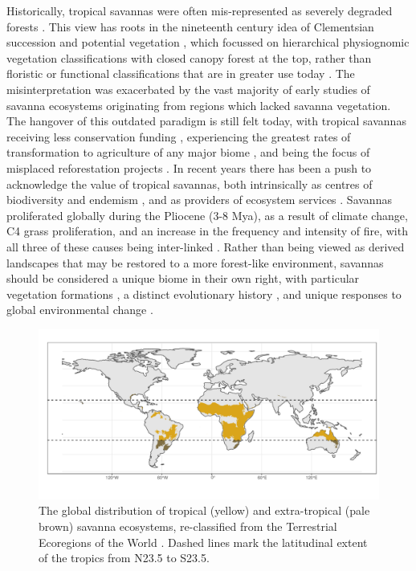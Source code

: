 \begin{refsection}
Historically, tropical savannas were often mis-represented as severely degraded forests \citep{Veldman2016}. This view has roots in the nineteenth century idea of Clementsian succession and potential vegetation \citep{Pulsford2014}, which focussed on hierarchical physiognomic vegetation classifications with closed canopy forest at the top, rather than floristic or functional classifications that are in greater use today \citep{Aleman2020}. The misinterpretation was exacerbated by the vast majority of early studies of savanna ecosystems originating from regions which lacked savanna vegetation. The hangover of this outdated paradigm is still felt today, with tropical savannas receiving less conservation funding \citep{Watson2016}, experiencing the greatest rates of transformation to agriculture of any major biome \citep{Hoekstra2004, Parr2014}, and being the focus of misplaced reforestation projects \citep{Silveira2020, Kumar2020, Laestadius2011}. In recent years there has been a push to acknowledge the value of tropical savannas, both intrinsically as centres of biodiversity and endemism \citep{Kumar2020, Pennington2018}, and as providers of ecosystem services \citep{Ryan2016}. Savannas proliferated globally during the Pliocene (\textapprox{}3-8 Mya), as a result of climate change, C4 grass proliferation, and an increase in the frequency and intensity of fire, with all three of these causes being inter-linked \citep{Cerling1997, Beerling2006, Edwards2010}. Rather than being viewed as derived landscapes that may be restored to a more forest-like environment, savannas should be considered a unique biome in their own right, with particular vegetation formations \citep{Torello2013}, a distinct evolutionary history \citep{Veldman2015}, and unique responses to global environmental change \citep{}.

\begin{figure}[!htb]
\centering
	\includegraphics[width=\textwidth]{img/savanna_map}
	\caption{The global distribution of tropical (yellow) and extra-tropical (pale brown) savanna ecosystems, re-classified from the Terrestrial Ecoregions of the World \citep{Dinerstein2017}. Dashed lines mark the latitudinal extent of the tropics from N23.5\textdegree{} to S23.5\textdegree{}.}
	\label{background:savanna_map}
\end{figure}


\end{refsection}
